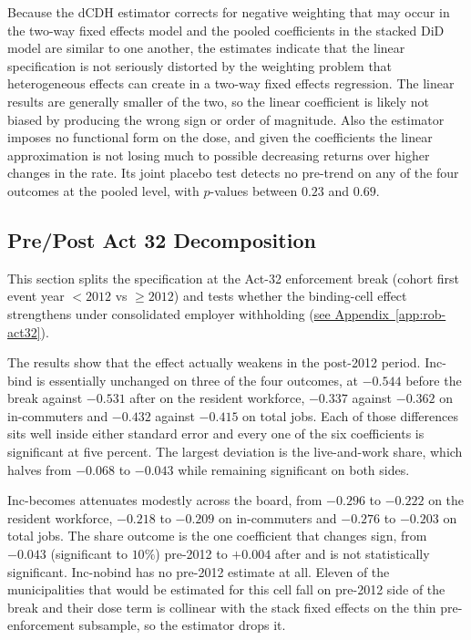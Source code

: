 \documentclass[12pt]{article}
\begin{document}
Because the
dCDH estimator corrects for negative weighting that may occur in the two-way fixed effects model and the
pooled coefficients in the stacked DiD model are similar to one another, the estimates indicate that the linear specification is not seriously
distorted by the weighting problem that heterogeneous effects can create
in a two-way fixed effects regression. The linear results are generally smaller of
the two,  so the linear coefficient is likely 
not biased by producing the wrong sign or order of magnitude. Also the estimator
imposes no functional form on the dose, and given the coefficients the linear
approximation is not losing much to possible decreasing returns over higher changes in the rate. Its joint placebo test detects no
pre-trend on any of the four outcomes at the pooled level, with $p$-values
between $0.23$ and $0.69$.

\subsection{Pre/Post Act 32 Decomposition}
\label{subsec:rob-act32}

This section splits the specification at the Act-32
enforcement break (cohort first event year $<2012$ vs $\geq 2012$)
and tests whether the binding-cell effect strengthens under consolidated
employer withholding
(\hyperref[app:rob-act32]{see Appendix~\ref{app:rob-act32}}).

The results show that the effect actually weakens in the post-2012 period. Inc-bind is essentially unchanged on three of the four
outcomes, at $-0.544$ before the break against $-0.531$ after on the
resident workforce, $-0.337$ against $-0.362$ on in-commuters and $-0.432$
against $-0.415$ on total jobs. Each of those differences sits well inside
either standard error and every one of the six coefficients is significant
at five percent. The largest deviation is the live-and-work share, which halves
from $-0.068$ to $-0.043$ while remaining significant on both sides.

Inc-becomes attenuates modestly across the board, from $-0.296$ to
$-0.222$ on the resident workforce, $-0.218$ to $-0.209$ on in-commuters
and $-0.276$ to $-0.203$ on total jobs. The share outcome is the one coefficient
that changes sign, from $-0.043$ (significant to $10\%$) pre-2012 to $+0.004$ after and is not statistically significant. Inc-nobind has no pre-2012
estimate at all. Eleven of the municipalities that would be estimated for this cell fall on pre-2012 side of the
break and their dose term is collinear with the stack fixed effects on the
thin pre-enforcement subsample, so the estimator drops it.
\end{document}
